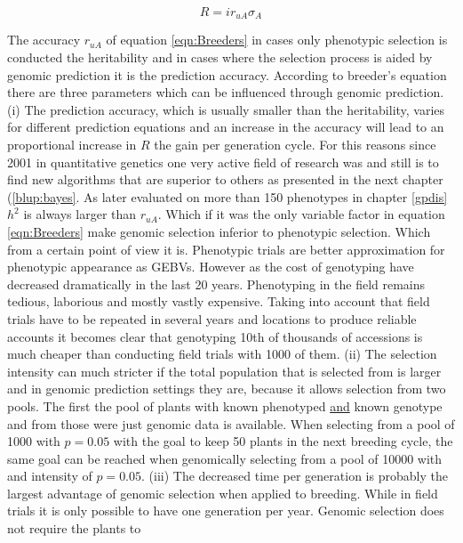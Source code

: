 \begin{equation}
 R = i r_{uA} \sigma_A
\label{eqn:Breeders}
\end{equation}

The accuracy $r_{uA}$ of equation \ref{eqn:Breeders} in cases only phenotypic selection is conducted the
heritability and in cases where the selection process is aided by genomic prediction it is the prediction
accuracy. According to breeder's equation there are three parameters which can be influenced through genomic
prediction. \newline (i) The prediction accuracy, which is usually smaller than the heritability, varies for
different prediction equations and an increase in the accuracy will lead to an proportional increase in $R$
the gain per generation cycle. For this reasons since 2001 in quantitative genetics one very active field of
research was and still is to find new algorithms that are superior to others as presented in the next chapter
(\ref{blup:bayes}. As later evaluated on more than 150 phenotypes in chapter \ref{gpdis} $h^2$ is always
larger than $r_{uA}$. Which if it was the only variable factor in equation \ref{eqn:Breeders} make genomic
selection inferior to phenotypic selection. Which from a certain point of view it is. Phenotypic trials are
better approximation for phenotypic appearance as GEBVs. However as the cost of genotyping have decreased
dramatically in the last 20 years. Phenotyping in the field remains tedious, laborious and mostly vastly
expensive. Taking into account that field trials have to be repeated in several years and locations to produce
reliable accounts it becomes clear that genotyping 10th of thousands of accessions is much cheaper than
conducting field trials with 1000 of them. \newline (ii) The selection intensity can much stricter if the
total population that is selected from is larger and in genomic prediction settings they are, because it
allows selection from two pools. The first the pool of plants with known phenotyped \underline{and} known
genotype and from those were just genomic data is available. When selecting from a pool of 1000 with $p=0.05$
with the goal to keep 50 plants in the next breeding cycle, the same goal can be reached when genomically
selecting from a pool of 10000 with and intensity of $p=0.05$. \newline (iii) The decreased time per
generation is probably the largest advantage of genomic selection when applied to breeding. While in field
trials it is only possible to have one generation per year. Genomic selection does not require the plants to
